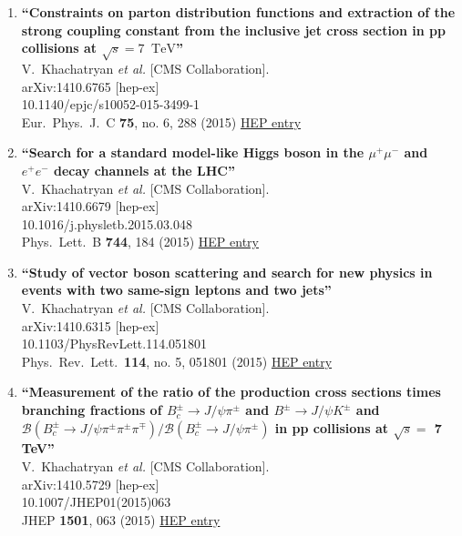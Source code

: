 \documentclass{article}
\begin{document}
\begin{enumerate}
\item%
{\bf ``Constraints on parton distribution functions and extraction of the strong coupling constant from the inclusive jet cross section in pp collisions at $\sqrt{s} = 7$ $\,\text {TeV}$''}
  \\{}V.~Khachatryan {\it et al.} [CMS Collaboration].
  \\{}arXiv:1410.6765 [hep-ex]
    \\{}10.1140/epjc/s10052-015-3499-1
\\{}Eur.\ Phys.\ J.\ C {\bf 75}, no. 6, 288 (2015) %
\href{http://inspirehep.net/record/1323630}{HEP entry}


\item%
{\bf ``Search for a standard model-like Higgs boson in the $μ^+μ^−$ and $e^+e^−$ decay channels at the LHC''}
  \\{}V.~Khachatryan {\it et al.} [CMS Collaboration].
  \\{}arXiv:1410.6679 [hep-ex]
    \\{}10.1016/j.physletb.2015.03.048
\\{}Phys.\ Lett.\ B {\bf 744}, 184 (2015) %
\href{http://inspirehep.net/record/1323624}{HEP entry}


\item%
{\bf ``Study of vector boson scattering and search for new physics in events with two same-sign leptons and two jets''}
  \\{}V.~Khachatryan {\it et al.} [CMS Collaboration].
  \\{}arXiv:1410.6315 [hep-ex]
    \\{}10.1103/PhysRevLett.114.051801
\\{}Phys.\ Rev.\ Lett.\  {\bf 114}, no. 5, 051801 (2015) %
\href{http://inspirehep.net/record/1323444}{HEP entry}


\item%
{\bf ``Measurement of the ratio of the production cross sections times branching fractions of $B_{c}^{\pm} \to J/\psi \pi^{\pm}$ and $B^{\pm} \to J/\psi K^{\pm}$ and $\mathcal{B}(B_{c}^{\pm} \to J/\psi \pi^{\pm}\pi^{\pm}\pi^{\mp})/\mathcal{B}(B_{c}^{\pm} \to J/\psi \pi^{\pm})$ in pp collisions at $\sqrt{s} =$ 7 TeV''}
  \\{}V.~Khachatryan {\it et al.} [CMS Collaboration].
  \\{}arXiv:1410.5729 [hep-ex]
    \\{}10.1007/JHEP01(2015)063
\\{}JHEP {\bf 1501}, 063 (2015) %
\href{http://inspirehep.net/record/1323075}{HEP entry}



\end{enumerate}
\end{document}
